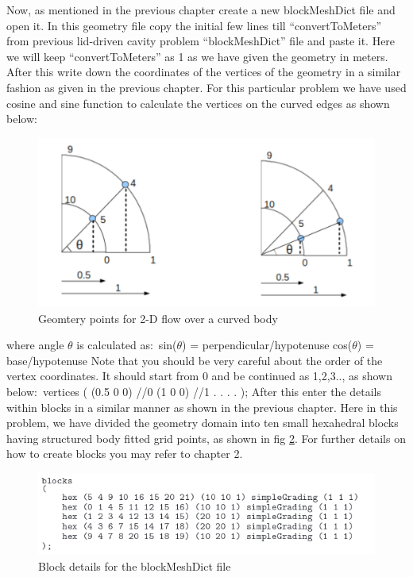 \documentclass[a4paper,12pt]{report}
\begin{document}
\flushleft Now, as mentioned in the previous chapter create a new blockMeshDict file and open it. In this geometry file  copy the initial few lines  till “convertToMeters” from previous lid-driven cavity problem “blockMeshDict” file and paste it. Here we will keep “convertToMeters” as 1 as we have given the geometry in meters. After this write down the coordinates of the vertices of the geometry in a similar fashion as given in the previous chapter. 
\flushleft For this particular problem we have used cosine and sine function to calculate the vertices on the curved edges as shown below{$:$}

\begin{figure}[ht]  
\begin{center}  
\includegraphics[scale=0.6]{angle.png}
\caption{Geomtery points for 2-D flow over a curved body}
\label{angle}
\end{center}  
\end{figure}

\flushleft where angle {$\theta$}  is calculated as{$:$}
\flushleft sin({$\theta$}) = perpendicular/hypotenuse
\flushleft cos({$\theta$}) = base/hypotenuse
\flushleft Note that you should be very careful about the order of the vertex coordinates. It should start from 0 and be continued as 1,2,3.., as shown below{$:$}
\flushleft vertices
\flushleft(
\flushleft  (0.5 0 0)	//0
\flushleft  (1 0 0)	//1
\flushleft.
\flushleft.
\flushleft.
\flushleft.
\flushleft);
\flushleft After this enter the details within blocks in a similar manner as shown in the previous chapter. Here in this problem, we have divided the geometry domain into ten small hexahedral blocks having structured body fitted grid points, as shown in fig \ref{blocks}. For further details on how to create blocks you may refer to chapter 2.

\begin{figure}[ht]  
\begin{center}  
\includegraphics[scale=0.6]{blocks.png}
\caption{Block details for the blockMeshDict file}
\label{blocks}
\end{center}  
\end{figure}
\end{document}
